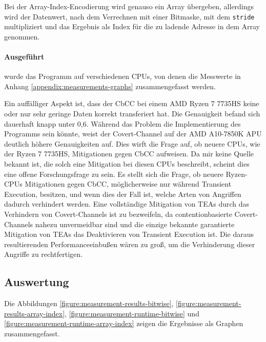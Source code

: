 Bei der Array-Index-Encodierung wird genauso ein Array übergeben,
allerdings wird der Datenwert, nach dem Verrechnen mit einer
Bitmaske, mit dem \verb|stride| multipliziert und das Ergebnis als
Index für die zu ladende Adresse in dem Array genommen.

\paragraph{Ausgeführt} wurde das Programm auf verschiedenen
\acp{CPU}, von denen die Messwerte in Anhang
\ref{appendix:measurements-graphs} zusammengefasst werden.

Ein auffälliger Aspekt ist, dass der \ac{CbCC} bei einem
AMD Ryzen 7 7735HS keine oder nur sehr geringe
Daten korrekt transferiert hat. Die Genauigkeit befand sich
dauerhaft knapp unter 0,6. Während das Problem die
Implementierung des Programms sein könnte, weist der
Covert-Channel auf der AMD A10-7850K APU deutlich höhere
Genauigkeiten auf. Dies wirft die Frage auf, ob neuere \acp{CPU}, wie
der Ryzen 7 7735HS, Mitigationen gegen \ac{CbCC} aufweisen. Da
mir keine Quelle bekannt ist, die solch
eine Mitigation bei diesen \acp{CPU} beschreibt, scheint dies eine
offene Forschungsfrage zu sein. Es stellt sich die Frage, ob
neuere Ryzen-\acp{CPU} Mitigationen gegen \ac{CbCC},
möglicherweise nur während Transient Execution, besitzen, und
wenn dies der Fall ist, welche Arten von Angriffen dadurch
verhindert werden.
Eine vollständige Mitigation von \acp{TEA} durch das Verhindern
von Covert-Channels ist zu bezweifeln, da contentionbasierte
Covert-Channels nahezu unvermeidbar sind und die einzige bekannte
garantierte Mitigation von \acp{TEA} das
Deaktivieren von Transient Execution ist. Die daraus
resultierenden Performanceeinbußen wären zu groß, um die
Verhinderung dieser Angriffe zu rechtfertigen.

\subsection{Auswertung}
\label{section:experimental-results}
Die Abbildungen
\ref{figure:measurement-results-bitwise},
\ref{figure:measurement-results-array-index},
\ref{figure:measurement-runtime-bitwise} und
\ref{figure:measurement-runtime-array-index}
zeigen die Ergebnisse als Graphen zusammengefasst.

